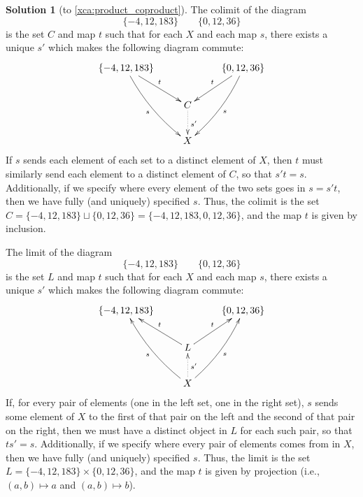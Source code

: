 \documentclass{amsart}
\theoremstyle{definition} \newaliasedtheorem{defn}[thm]{Definition}
\theoremstyle{definition} \newtheorem*{defn*}{Definition}
\theoremstyle{definition} \newaliasedtheorem{xca}[thm]{Exercise}
\theoremstyle{definition} \newtheorem*{soln*}{Solution}
\theoremstyle{definition} \newaliasedtheorem{remark}[thm]{Remark}
\theoremstyle{definition} \newtheorem*{remark*}{Remark}
\begin{document}
    \begin{soln*}[to \autoref{xca:product_coproduct}] \label{sol:product_coproduct}
      The colimit of the diagram
      \[
        \{-4, 12, 183\}\qquad \{0, 12, 36\}
      \]
      is the set $C$ and map $t$ such that for each $X$ and each map $s$, there exists a unique $s'$ which makes the following diagram commute:
      \[
      \xymatrix{
        \{-4, 12, 183\}\ar@/_/[ddr]_s\ar[dr]^t && \{0, 12, 36\}\ar@/^/[ddl]^s\ar[dl]_t \\
        & C\ar@{.>}[d]^{s'}& \\
        &X&
      }
    \]
    If $s$ sends each element of each set to a distinct element of $X$, then $t$ must similarly send each element to a distinct element of $C$, so that $s't = s$.  Additionally, if we specify where every element of the two sets goes in $s = s't$, then we have fully (and uniquely) specified $s$.  Thus, the colimit is the set $C = \{-4, 12, 183\}\sqcup \{0, 12, 36\} = \{-4, 12, 183, 0, 12, 36\}$, and the map $t$ is given by inclusion.
    
    
      The limit of the diagram
      \[
        \{-4, 12, 183\}\qquad \{0, 12, 36\}
      \]
      is the set $L$ and map $t$ such that for each $X$ and each map $s$, there exists a unique $s'$ which makes the following diagram commute:
      \[
      \xymatrix{
        \{-4, 12, 183\} && \{0, 12, 36\} \\
        &L\ar[ul]_t\ar[ur]^t& \\
        &X\ar@/^/[uul]^s\ar@/_/[uur]_s\ar@{.>}[u]_{s'}&
      }
    \]
    If, for every pair of elements (one in the left set, one in the right set), $s$ sends some element of $X$ to the first of that pair on the left and the second of that pair on the right, then we must have a distinct object in $L$ for each such pair, so that $ts' = s$.  Additionally, if we specify where every pair of elements comes from in $X$, then we have fully (and uniquely) specified $s$.  Thus, the limit is the set $L = \{-4, 12, 183\}\times \{0, 12, 36\}$, and the map $t$ is given by projection (i.e., $(a, b) \mapsto a$ and $(a, b) \mapsto b$).
    \end{soln*}
\end{document}
